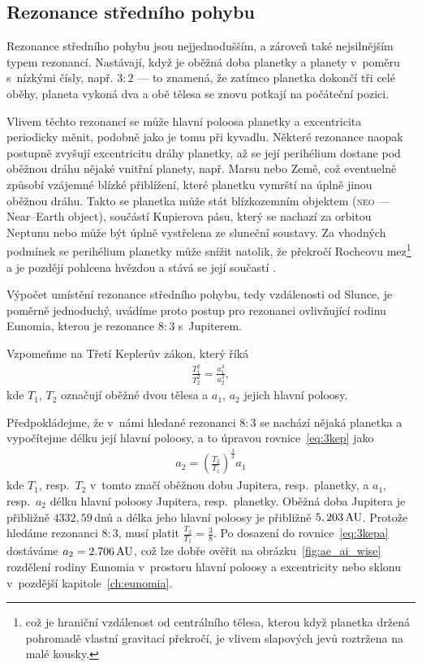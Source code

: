 \documentclass[A4paper, 12pt, oneside]{book}%
\newcommand{\C}[1]{\textsc{#1}}
\begin{document}
\subsection{Rezonance středního pohybu} \label{sec:meanmotion}

Rezonance středního pohybu jsou nejjednodušším, a zároveň také nejsilnějším typem rezonancí. Nastávají, když je oběžná doba planetky a planety v~poměru s~nízkými čísly, např. $3:2$ --- to znamená, že zatímco planetka dokončí tři celé oběhy, planeta vykoná dva a obě tělesa se znovu potkají na počáteční pozici. 

Vlivem těchto rezonancí se může hlavní poloosa planetky a excentricita periodicky měnit, podobně jako je tomu při kyvadlu. Některé rezonance naopak postupně zvyšují excentricitu dráhy planetky, až se její perihélium dostane pod oběžnou dráhu nějaké vnitřní planety, např. Marsu nebo Země, což eventuelně způsobí vzájemné blízké přiblížení, které planetku vymrští na úplně jinou oběžnou dráhu. Takto se planetka může stát blízkozemním objektem (\C{neo} --- Near--Earth object), součástí Kupierova pásu, který se nachazí za orbitou Neptunu nebo může být úplně vystřelena ze sluneční soustavy. Za vhodných podmínek se perihélium planetky může snížit natolik, že překročí Rocheovu mez\footnote{což je hraniční vzdálenost od centrálního tělesa, kterou když planetka držená pohromadě vlastní gravitací překročí, je vlivem slapových jevů roztržena na malé kousky.} a je později pohlcena hvězdou a stává se její součastí \cite{pichierri17}.

Výpočet umístění rezonance středního pohybu, tedy vzdálenosti od Slunce, je poměrně jednoduchý, uvádíme proto postup pro rezonanci ovlivňující rodinu Eunomia, kterou je rezonance $8:3$ s~Jupiterem.

Vzpomeňme na Třetí Keplerův zákon, který říká
\begin{align} \label{eq:3kep}
	\frac{T_1^2}{T_2^2}=\frac{a_1^3}{a_2^3}, 
\end{align}
kde $T_1$, $T_2$ označují oběžné dvou tělesa a $a_1$, $a_2$ jejich hlavní poloosy. 

Předpokládejme, že v~námi hledané rezonanci $8:3$ se nachází nějaká planetka a vypočítejme délku její hlavní poloosy, a to úpravou rovnice~\eqref{eq:3kep} jako
\begin{align} \label{eq:3kepa}
	a_2=\left(\frac{T_2}{T_1}\right)^{\frac{3}{2}}a_1
\end{align}
kde $T_1$, resp.\ $T_2$ v~tomto značí oběžnou dobu Jupitera, resp.\ planetky, a $a_1$, resp.\ $a_2$ délku hlavní poloosy Jupitera, resp.\ planetky. Oběžná doba Jupitera je přibližně $4332,59\,$dnů a délka jeho hlavní poloosy je přibližně $5,203\,{\rm AU}$. Protože hledáme rezonanci $8:3$, musí platit $\frac{T_2}{T_1}=\frac{3}{8}$. Po dosazení do rovnice~\eqref{eq:3kepa} dostáváme $a_2=2.706\,{\rm AU}$, což lze dobře ověřit na obrázku~\ref{fig:ae_ai_wise} rozdělení rodiny Eunomia v~prostoru hlavní poloosy a excentricity nebo sklonu v~pozdější kapitole~\ref{ch:eunomia}.
\end{document}
